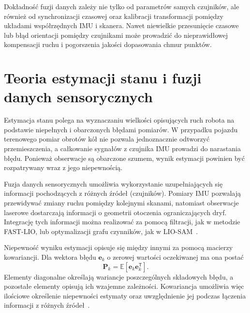 \documentclass[a4paper,twoside,12pt]{book}
\begin{document}
Dokładność fuzji danych zależy nie tylko od parametrów samych czujników, ale również od synchronizacji czasowej oraz kalibracji transformacji pomiędzy układami współrzędnych IMU i skanera. Nawet niewielkie przesunięcie czasowe lub błąd orientacji pomiędzy czujnikami może prowadzić do nieprawidłowej kompensacji ruchu i pogorszenia jakości dopasowania chmur punktów.

\section{Teoria estymacji stanu i fuzji danych sensorycznych}
Estymacja stanu polega na wyznaczaniu wielkości opisujących ruch robota na podstawie niepełnych i obarczonych błędami pomiarów. W przypadku pojazdu terenowego pomiar obrotów kół nie pozwala jednoznacznie odtworzyć przemieszczenia, a całkowanie sygnałów z czujnika IMU prowadzi do narastania błędu. Ponieważ obserwacje są obarczone szumem, wynik estymacji powinien być rozpatrywany wraz z jego niepewnością.

Fuzja danych sensorycznych umożliwia wykorzystanie uzupełniających się informacji pochodzących z różnych źródeł (czujników). Pomiary IMU pozwalają przewidywać zmiany ruchu pomiędzy kolejnymi skanami, natomiast obserwacje laserowe dostarczają informacji o geometrii otoczenia ograniczających dryf. Integrację tych informacji można realizować za pomocą filtracji, jak w metodzie FAST-LIO, lub optymalizacji grafu czynników, jak w LIO-SAM~\cite{Xu2020FASTLIOAF,9341176}.

Niepewność wyniku estymacji opisuje się między innymi za pomocą macierzy kowariancji. Dla wektora błędu $\mathbf{e}_k$ o zerowej wartości oczekiwanej ma ona postać
\begin{equation}
    \mathbf{P}_k =
    \mathbb{E}\!\left[\mathbf{e}_k\mathbf{e}_k^{\mathsf T}\right].
    \label{eq:zalazek_kowariancja}
\end{equation}
Elementy diagonalne określają wariancje poszczególnych składowych błędu, a pozostałe elementy opisują ich wzajemne zależności. Kowariancja umożliwia więc ilościowe określenie niepewności estymaty oraz uwzględnienie jej podczas łączenia informacji z różnych źródeł~\cite{rb3_barfoot2017}.
\end{document}
